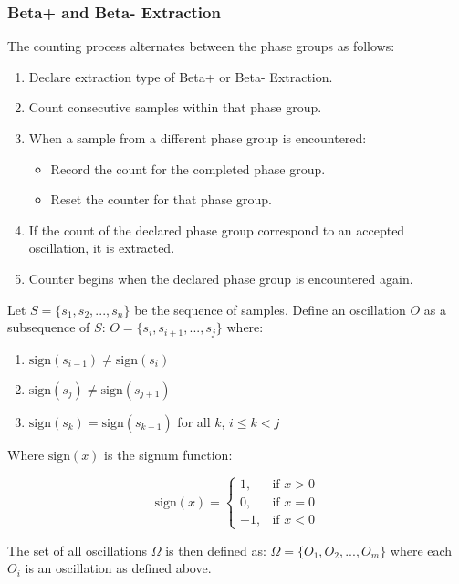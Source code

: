 \documentclass[12pt,a4paper]{article}
\begin{document}
\subsubsection{Beta+ and Beta- Extraction}
\noindent The counting process alternates between the phase groups as follows:
\begin{enumerate}
    \item Declare extraction type of Beta+ or Beta- Extraction.
    \item Count consecutive samples within that phase group.
    
    \item When a sample from a different phase group is encountered:
    \begin{itemize}
        \item Record the count for the completed phase group.
        \item Reset the counter for that phase group.
    \end{itemize}
    
    \item If the count of the declared phase group correspond to an accepted oscillation, it is extracted.
    \item Counter begins when the declared phase group is encountered again.
\end{enumerate}
Let $S = \{s_1, s_2, ..., s_n\}$ be the sequence of samples. Define an oscillation $O$ as a subsequence of $S$: $O = \{s_i, s_{i+1}, ..., s_j\}$ where:

\begin{enumerate}
\item $\text{sign}(s_{i-1}) \neq \text{sign}(s_i)$
\item $\text{sign}(s_j) \neq \text{sign}(s_{j+1})$
\item $\text{sign}(s_k) = \text{sign}(s_{k+1})$ for all $k$, $i \leq k < j$
\end{enumerate}

Where $\text{sign}(x)$ is the signum function:

\begin{equation*}
\text{sign}(x) = \begin{cases}
1, & \text{if } x > 0 \\
0, & \text{if } x = 0 \\
-1, & \text{if } x < 0
\end{cases}
\end{equation*}

The set of all oscillations $\Omega$ is then defined as: $\Omega = \{O_1, O_2, ..., O_m\}$ where each $O_i$ is an oscillation as defined above.
\end{document}
